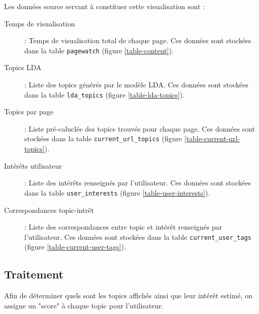 		Les données source servant à constituer cette visualisation sont :
		\begin{description}
			\item[Temps de visualisation] : Temps de visualisation total de chaque page. Ces données sont stockées dans la table \texttt{pagewatch} (figure \ref{table-content}).
			\item[Topics LDA] : Liste des topics générés par le modèle LDA. Ces données sont stockées dans la table \texttt{lda\_topics} (figure \ref{table-lda-topics}).
			\item[Topics par page] : Liste pré-caluclée des topics trouvés pour chaque page. Ces données sont stockées dans la table \texttt{current\_url\_topics} (figure \ref{table-current-url-topics}).
			\item[Intérêts utilisateur] : Liste des intérêts renseignés par l'utilisateur. Ces données sont stockées dans la table \texttt{user\_interests} (figure \ref{table-user-interests}).
			\item[Correspondances topic-intrêt] : Liste des correspondances entre topic et intérêt renseignés par l'utilisateur. Ces données sont stockées dans la table \texttt{current\_user\_tags} (figure \ref{table-current-user-tags}).
		\end{description}

	\subsection{Traitement}

		Afin de déterminer quels sont les topics affichés ainsi que leur intérêt estimé, on assigne un "score" à chaque topic pour l'utilisateur.

